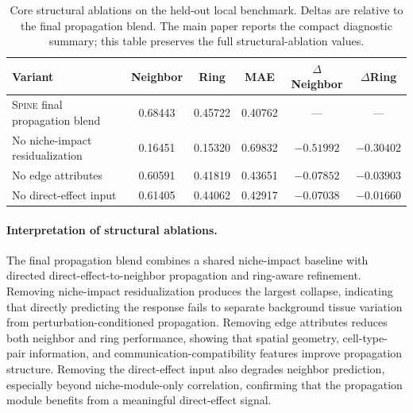 \documentclass[sigconf,anonymous,review]{acmart}
\newcommand{\methodname}{\textsc{Spine}\xspace}
\begin{document}
\begin{table}[t]
\centering
\caption{Core structural ablations on the held-out local benchmark. Deltas are relative to the final propagation blend. The main paper reports the compact diagnostic summary; this table preserves the full structural-ablation values.}
\label{tab:app_core_structural_ablations}
\small
\setlength{\tabcolsep}{5pt}
\renewcommand{\arraystretch}{1.12}
\begin{tabularx}{\textwidth}{@{}>{\raggedright\arraybackslash}Xccccc@{}}
\toprule
Variant & Neighbor & Ring & MAE & $\Delta$Neighbor & $\Delta$Ring \\
\midrule
\rowcolor{cyan!10}
\methodname{} final propagation blend &
0.68443 & 0.45722 & 0.40762 & --- & --- \\

No niche-impact residualization &
0.16451 & 0.15320 & 0.69832 & $-0.51992$ & $-0.30402$ \\

No edge attributes &
0.60591 & 0.41819 & 0.43651 & $-0.07852$ & $-0.03903$ \\

No direct-effect input &
0.61405 & 0.44062 & 0.42917 & $-0.07038$ & $-0.01660$ \\
\bottomrule
\end{tabularx}
\end{table}

\paragraph{Interpretation of structural ablations.}
The final propagation blend combines a shared niche-impact baseline with directed direct-effect-to-neighbor propagation and ring-aware refinement. Removing niche-impact residualization produces the largest collapse, indicating that directly predicting the response fails to separate background tissue variation from perturbation-conditioned propagation. Removing edge attributes reduces both neighbor and ring performance, showing that spatial geometry, cell-type-pair information, and communication-compatibility features improve propagation structure. Removing the direct-effect input also degrades neighbor prediction, especially beyond niche-module-only correlation, confirming that the propagation module benefits from a meaningful direct-effect signal.
\end{document}
